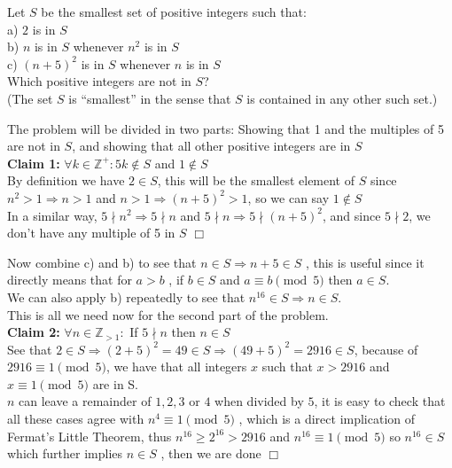 \documentclass[12pt]{article}
\newcounter{problem}
\begin{document}
\begin{problem}[N][5][Putnam 2017/A1]
    Let $S$ be the smallest set of positive integers such that: \vspace{1mm} \\
        a) $2$ is in $S$ \\
        b) $n$ is in $S$ whenever $n^2$ is in $S$\\
        c) $(n+5)^2$ is in $S$ whenever $n$ is in $S$ \vspace{2mm}\\
        Which positive integers are not in $S$? \\
        (The set $S$ is “smallest” in the sense that $S$ is contained in any other such set.)
   
\end{problem}
    
\begin{solution}
   The problem will be divided in two parts: Showing that 1 and the multiples of 5 are not in $S$, and showing that all other positive integers are in $S$ \vspace{2mm} \\
    \textbf{Claim 1:} $\forall k \in \mathbb{Z^+}: 5k \notin S$ and $1\notin S$ \vspace{3mm} \\
    By definition we have $2\in S$, this will be the smallest element of $S$ since $n^2>1 \Rightarrow n>1$ and $n>1 \Rightarrow(n+5)^2>1$, so we can say $1 \notin S$ \\
    In a similar way, $5 \nmid n^2 \Rightarrow 5 \nmid n$ and $5 \nmid n \Rightarrow 5 \nmid (n+5)^2$, and since $5 \nmid 2$, we don't have any multiple of 5 in $S$ $\Box$

    Now combine c) and b) to see that $n \in S \Rightarrow n+5 \in S$ , this is useful since it directly means that for $a>b$ , if $b \in S$ and $a \equiv b \pmod5$ then $a \in S$.\\
    We can also apply b) repeatedly to see that $n^{16} \in S \Rightarrow n \in S$. \\
    This is all we need now for the second part of the problem.\vspace{2mm} \\
    \textbf{Claim 2:} $\forall n \in \mathbb{Z}_{>1} :$ If $5 \nmid n$ then $n \in S$ \vspace{3mm} \\
    See that $2 \in S \Rightarrow (2+5)^2 = 49 \in S \Rightarrow (49+5)^2 = 2916 \in S$, because of $2916 \equiv1 \pmod5$, we have that all integers $x$ such that $x>2916$ and $x \equiv 1 \pmod5$ are in S.\vspace{2mm} \\
    $n$ can leave a remainder of $1,2,3$ or $4$ when divided by $5$, it is easy to check that all these cases agree with $n^4 \equiv 1 \pmod 5$ , which is a direct implication of Fermat's Little Theorem, thus $n^{16} \geq 2^{16} > 2916$ and $n^{16} \equiv 1 \pmod5$ so $n^{16} \in S$ which further implies $n \in S$ , then we are done $\Box$
\end{solution}
\end{document}
